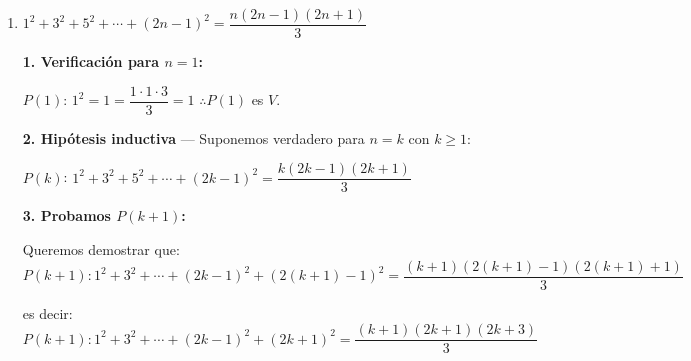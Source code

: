 \documentclass[12pt]{article}
\begin{document}
\begin{enumerate}[label=\alph*.-]
    $P(1)$: $1 = \dfrac{1 \cdot 2}{2} = 1$ \quad $\therefore P(1)$ es $V$.

    \textbf{2. Hipótesis inductiva} — Suponemos verdadero para $n = k$ con $k \geq 1$:

    $P(k)$: $1 + 2 + 3 + \cdots + k = \dfrac{k(k+1)}{2}$

    \newpage
    
    \textbf{3. Probamos $P(k+1)$:}

    Queremos demostrar que:
    \[P(k+1): 1 + 2 + 3 + \cdots + k + (k+1) = \frac{(k+1)(k+2)}{2}\]

    Partimos del lado izquierdo y usamos la hipótesis inductiva $P(k)$:
    \begin{align*}
        1 + 2 + \cdots + k + (k+1) &= \frac{k(k+1)}{2} + (k+1) \\
        &= \frac{k(k+1) + 2(k+1)}{2} \\
        &= \frac{(k+1)(k+2)}{2} \\
        &= \frac{k^2 + 3k + 2}{2}
    \end{align*}

    Factorizamos $k^2 + 3k + 2$ usando la fórmula cuadrática:
    \[k_{1,2} = \frac{-3 \pm \sqrt{9 - 8}}{2} = \frac{-3 \pm 1}{2} \quad \therefore k_1 = -1, \quad k_2 = -2\]

    $\therefore k^2 + 3k + 2 = (k+1)(k+2)$

    Sustituyendo:
    \[\frac{(k+1)(k+2)}{2}\]

    Que es exactamente el lado derecho de $P(k+1)$. $\therefore P(k+1)$ es $V$, y la proposición queda demostrada para todo $n \geq 1$.

    \item $1^2 + 3^2 + 5^2 + \cdots + (2n-1)^2 = \dfrac{n(2n-1)(2n+1)}{3}$

    \textbf{1. Verificación para $n = 1$:}

    $P(1)$: $1^2 = 1 = \dfrac{1 \cdot 1 \cdot 3}{3} = 1$ \quad $\therefore P(1)$ es $V$.

    \textbf{2. Hipótesis inductiva} — Suponemos verdadero para $n = k$ con $k \geq 1$:

    $P(k)$: $1^2 + 3^2 + 5^2 + \cdots + (2k-1)^2 = \dfrac{k(2k-1)(2k+1)}{3}$

    \textbf{3. Probamos $P(k+1)$:}

    Queremos demostrar que:
    \[P(k+1): 1^2 + 3^2 + \cdots + (2k-1)^2 + (2(k+1)-1)^2 = \frac{(k+1)(2(k+1)-1)(2(k+1)+1)}{3}\]

    es decir:
    \[P(k+1): 1^2 + 3^2 + \cdots + (2k-1)^2 + (2k+1)^2 = \frac{(k+1)(2k+1)(2k+3)}{3}\]


\end{enumerate}
\end{document}
